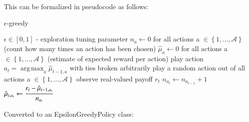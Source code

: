 \documentclass{jss}
\DeclareMathOperator*{\argmax}{arg\,max}
\begin{document}
This can be formalized in pseudocode as follows:

\begin{algorithm}[H]
\caption{$\epsilon$-greedy}
\label{Alg:EpsilonGreedy}
\begin{algorithmic}
\REQUIRE \(    \epsilon  \in \left[ 0,1 \right] \) - exploration tuning parameter
\STATE \( n_{a} \leftarrow 0 \) for all actions a \(  \in \left\{ 1, \dots, \mathcal{A} \right\} \)  (count how many times an action has been chosen)
\STATE \( \hat{\mu}_{a} \leftarrow 0 \) for all actions a  \(   \in \left\{ 1, \dots, \mathcal{A} \right\} \)  (estimate of expected reward per action)
		\STATE play action \(a_t = \argmax_a  \hat{\mu}_{t-1,a}  \) with ties broken arbitrarily
	\ELSE
		\STATE play a random action out of all actions a \(  \in \left\{ 1, \dots, \mathcal{A} \right\} \)
	\ENDIF
	\STATE observe real-valued payoff $r_t$
	\STATE \( n_{a_{t}} \leftarrow n_{a_{t-1}} + 1  \) 
  \STATE \( \hat{\mu}_{t,a_{t}} \leftarrow   \cfrac{r_t - \hat{\mu}_{t-1,a_{t}} }{n_{a_{t}}}   \) 
\ENDFOR
\end{algorithmic}
\end{algorithm}

Converted to an EpsilonGreedyPolicy class:
\end{document}
